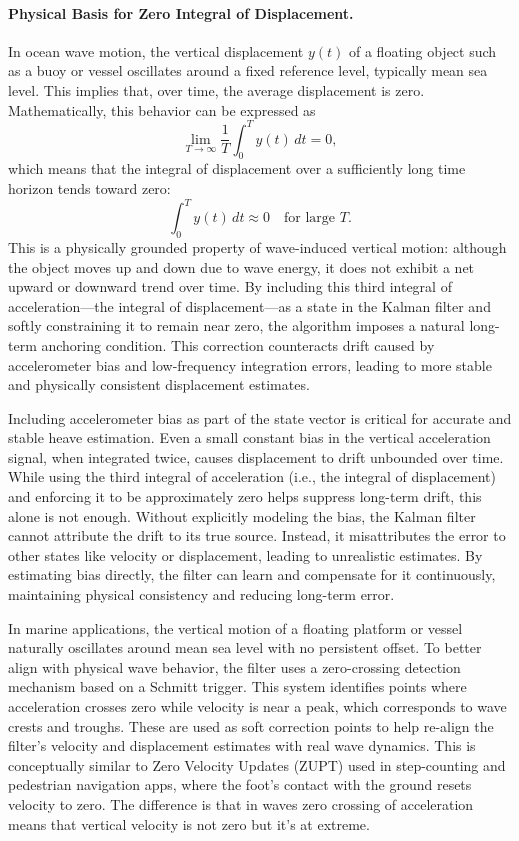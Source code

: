 \documentclass[11pt,letterpaper]{article}
\begin{document}
\paragraph{Physical Basis for Zero Integral of Displacement.}
In ocean wave motion, the vertical displacement \( y(t) \) of a floating object such as a buoy or vessel oscillates around a fixed reference level, typically mean sea level. This implies that, over time, the average displacement is zero. Mathematically, this behavior can be expressed as
\begin{equation}
\lim_{T \to \infty} \frac{1}{T} \int_0^T y(t) \, dt = 0,
\end{equation}
which means that the integral of displacement over a sufficiently long time horizon tends toward zero:
\begin{equation}
\int_0^T y(t) \, dt \approx 0 \quad \text{for large } T.
\end{equation}
This is a physically grounded property of wave-induced vertical motion: although the object moves up and down due to wave energy, it does not exhibit a net upward or downward trend over time. By including this third integral of acceleration---the integral of displacement---as a state in the Kalman filter and softly constraining it to remain near zero, the algorithm imposes a natural long-term anchoring condition. This correction counteracts drift caused by accelerometer bias and low-frequency integration errors, leading to more stable and physically consistent displacement estimates.

Including accelerometer bias as part of the state vector is critical for accurate and stable heave estimation. Even a small constant bias in the vertical acceleration signal, when integrated twice, causes displacement to drift unbounded over time. While using the third integral of acceleration (i.e., the integral of displacement) and enforcing it to be approximately zero helps suppress long-term drift, this alone is not enough. Without explicitly modeling the bias, the Kalman filter cannot attribute the drift to its true source. Instead, it misattributes the error to other states like velocity or displacement, leading to unrealistic estimates. By estimating bias directly, the filter can learn and compensate for it continuously, maintaining physical consistency and reducing long-term error.

In marine applications, the vertical motion of a floating platform or vessel naturally oscillates around mean sea level with no persistent offset. To better align with physical wave behavior, the filter uses a zero-crossing detection mechanism based on a Schmitt trigger. This system identifies points where acceleration crosses zero while velocity is near a peak, which corresponds to wave crests and troughs. These are used as soft correction points to help re-align the filter’s velocity and displacement estimates with real wave dynamics. This is conceptually similar to Zero Velocity Updates (ZUPT) used in step-counting and pedestrian navigation apps, where the foot’s contact with the ground resets velocity to zero. The difference is that in waves zero crossing of acceleration means that vertical velocity is not zero but it's at extreme.
\end{document}

